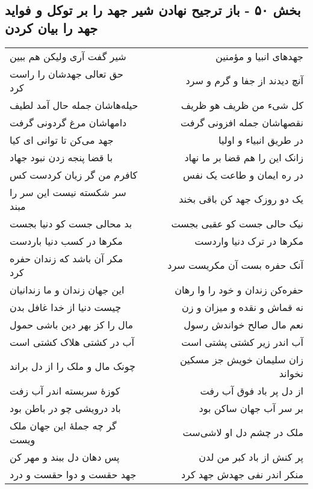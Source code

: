 \begin{center}
\section*{بخش ۵۰ - باز ترجیح نهادن شیر جهد را بر توکل و فواید جهد را بیان کردن}
\label{sec:sh050}
\begin{longtable}{l p{0.5cm} r}
شیر گفت آری ولیکن هم ببین
&&
جهدهای انبیا و مؤمنین
\\
حق تعالی جهدشان را راست کرد
&&
آنچ دیدند از جفا و گرم و سرد
\\
حیله‌هاشان جمله حال آمد لطیف
&&
کل شیء من ظریف هو ظریف
\\
دامهاشان مرغ گردونی گرفت
&&
نقصهاشان جمله افزونی گرفت
\\
جهد می‌کن تا توانی ای کیا
&&
در طریق انبیاء و اولیا
\\
با قضا پنجه زدن نبود جهاد
&&
زانک این را هم قضا بر ما نهاد
\\
کافرم من گر زیان کردست کس
&&
در ره ایمان و طاعت یک نفس
\\
سر شکسته نیست این سر را مبند
&&
یک دو روزک جهد کن باقی بخند
\\
بد محالی جست کو دنیا بجست
&&
نیک حالی جست کو عقبی بجست
\\
مکرها در کسب دنیا باردست
&&
مکرها در ترک دنیا واردست
\\
مکر آن باشد که زندان حفره کرد
&&
آنک حفره بست آن مکریست سرد
\\
این جهان زندان و ما زندانیان
&&
حفره‌کن زندان و خود را وا رهان
\\
چیست دنیا از خدا غافل بدن
&&
نه قماش و نقده و میزان و زن
\\
مال را کز بهر دین باشی حمول
&&
نعم مال صالح خواندش رسول
\\
آب در کشتی هلاک کشتی است
&&
آب اندر زیر کشتی پشتی است
\\
چونک مال و ملک را از دل براند
&&
زان سلیمان خویش جز مسکین نخواند
\\
کوزهٔ سربسته اندر آب زفت
&&
از دل پر باد فوق آب رفت
\\
باد درویشی چو در باطن بود
&&
بر سر آب جهان ساکن بود
\\
گر چه جملهٔ این جهان ملک ویست
&&
ملک در چشم دل او لاشی‌ست
\\
پس دهان دل ببند و مهر کن
&&
پر کنش از باد کبر من لدن
\\
جهد حقست و دوا حقست و درد
&&
منکر اندر نفی جهدش جهد کرد
\\
\end{longtable}
\end{center}
